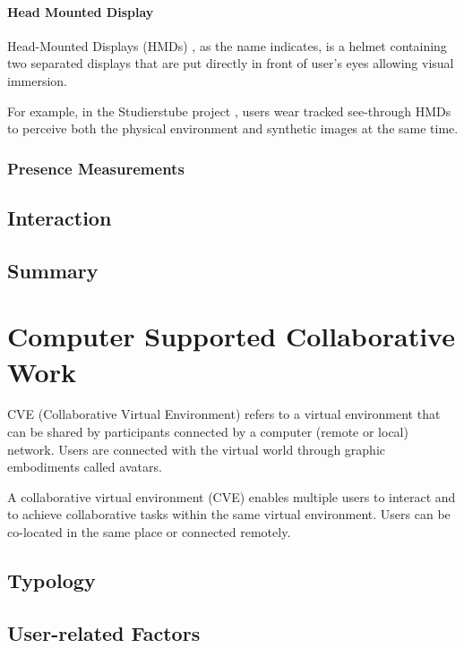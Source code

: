 \paragraph{Head Mounted Display}
Head-Mounted Displays (HMDs) \citep{Melzer1997HMD}, as the name indicates, is a helmet containing two separated displays that are put directly in front of user's eyes allowing visual immersion. 

For example, in the Studierstube project \citep{Schmalstieg2002Stube}, users wear tracked see-through HMDs to perceive both the physical environment and synthetic images at the same time.

\subsubsection{Presence Measurements}

\subsection{Interaction}

\subsection{Summary}

\section{Computer Supported Collaborative Work}
CVE (Collaborative Virtual Environment) refers to a virtual environment that can be shared by participants connected by a computer (remote or local) network. Users are connected with the virtual world through graphic embodiments called avatars.

A collaborative virtual environment (CVE) \citep{Benford2001CVE} enables multiple users to interact \citep{Schroeder2006Usability} and to achieve collaborative tasks \citep{Dodds2009Using} within the same virtual environment. Users can be co-located in the same place or connected remotely.

\subsection{Typology}

\subsection{User-related Factors}

